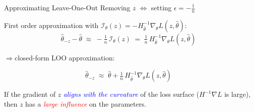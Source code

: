 \documentclass[aspectratio=169]{beamer}
\renewcommand{\emph}[1]{\textit{\textcolor{blue}{#1}}}
\newcommand{\remph}[1]{\textit{\textcolor{red}{#1}}}
\begin{document}
\begin{frame}{Approximating Leave-One-Out}
    Removing $z$ $\Leftrightarrow$ setting $\epsilon = -\tfrac{1}{n}$ 

    \pause
    \vspace{0.4cm}
    First order approximation with $\mathcal{I}_\theta(z) = -H_{\hat{\theta}}^{-1}\nabla_{\theta} L(z, \hat{\theta})$:
    \begin{equation}
        \hat{\theta}_{-z} - \hat{\theta} \;\approx\; -\tfrac{1}{n}\,\mathcal{I}_\theta(z) \;=\; \tfrac{1}{n}\, H_{\hat{\theta}}^{-1} \nabla_{\theta} L(z, \hat{\theta})
    \end{equation}

    \pause
    \vspace{0.2cm}
    \centerline{$\Longrightarrow$\quad closed-form LOO approximation:}
    \begin{equation}
        \hat{\theta}_{-z} \;\approx\; \hat{\theta} + \tfrac{1}{n}\, H_{\hat{\theta}}^{-1} \nabla_{\theta} L(z, \hat{\theta})
    \end{equation}

    \pause
    \vspace{0.3cm}
    \begin{intuitionbox}
        If the gradient of $z$ \emph{aligns with the curvature} of the loss surface ($H^{-1}\nabla L$ is large), then $z$ has a \remph{large influence} on the parameters.
    \end{intuitionbox}
\end{frame}
\end{document}
